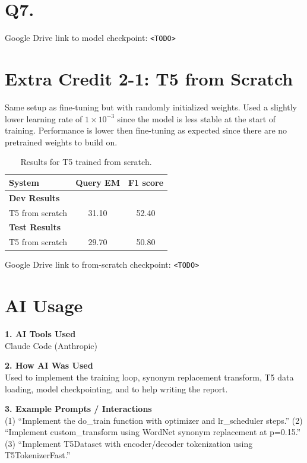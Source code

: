 \documentclass{article}
\begin{document}
\section*{Q7.}

Google Drive link to model checkpoint: \texttt{<TODO>}

\section*{Extra Credit 2-1: T5 from Scratch}

Same setup as fine-tuning but with randomly initialized weights. Used a slightly lower learning rate of $1 \times 10^{-3}$ since the model is less stable at the start of training. Performance is lower then fine-tuning as expected since there are no pretrained weights to build on.

\begin{table}[h!]
\centering
\begin{tabular}{lcc}
  \toprule
  System & Query EM & F1 score \\
  \midrule
  \multicolumn{3}{l}{\textbf{Dev Results}} \\
  \midrule
  T5 from scratch & 31.10 & 52.40 \\
  \midrule
  \multicolumn{3}{l}{\textbf{Test Results}} \\
  \midrule
  T5 from scratch & 29.70 & 50.80 \\
  \bottomrule
\end{tabular}
\caption{Results for T5 trained from scratch.}
\end{table}

Google Drive link to from-scratch checkpoint: \texttt{<TODO>}

\section*{AI Usage}

\noindent\textbf{1. AI Tools Used} \\
Claude Code (Anthropic) \\
\hrulefill

\noindent\textbf{2. How AI Was Used} \\
Used to implement the training loop, synonym replacement transform, T5 data loading, model checkpointing, and to help writing the report. \\
\hrulefill

\noindent\textbf{3. Example Prompts / Interactions} \\
(1) ``Implement the do\_train function with optimizer and lr\_scheduler steps.''
(2) ``Implement custom\_transform using WordNet synonym replacement at p=0.15.''
(3) ``Implement T5Dataset with encoder/decoder tokenization using T5TokenizerFast.'' \\
\hrulefill
\end{document}
